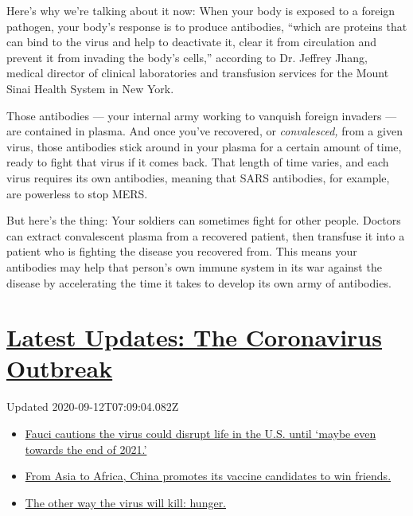 Here's why we're talking about it now: When your body is exposed to a
foreign pathogen, your body's response is to produce antibodies, ``which
are proteins that can bind to the virus and help to deactivate it, clear
it from circulation and prevent it from invading the body's cells,''
according to Dr. Jeffrey Jhang, medical director of clinical
laboratories and transfusion services for the Mount Sinai Health System
in New York.

Those antibodies --- your internal army working to vanquish foreign
invaders --- are contained in plasma. And once you've recovered, or
\emph{convalesced,} from a given virus, those antibodies stick around in
your plasma for a certain amount of time, ready to fight that virus if
it comes back. That length of time varies, and each virus requires its
own antibodies, meaning that SARS antibodies, for example, are powerless
to stop MERS.

But here's the thing: Your soldiers can sometimes fight for other
people. Doctors can extract convalescent plasma from a recovered
patient, then transfuse it into a patient who is fighting the disease
you recovered from. This means your antibodies may help that person's
own immune system in its war against the disease by accelerating the
time it takes to develop its own army of antibodies.

\hypertarget{latest-updates-the-coronavirus-outbreak}{%
\section{\texorpdfstring{\href{https://www.nytimes3xbfgragh.onion/2020/09/11/world/covid-19-coronavirus.html?action=click\&pgtype=Article\&state=default\&region=MAIN_CONTENT_1\&context=storylines_live_updates}{Latest
Updates: The Coronavirus
Outbreak}}{Latest Updates: The Coronavirus Outbreak}}\label{latest-updates-the-coronavirus-outbreak}}

Updated 2020-09-12T07:09:04.082Z

\begin{itemize}
\tightlist
\item
  \href{https://www.nytimes3xbfgragh.onion/2020/09/11/world/covid-19-coronavirus.html?action=click\&pgtype=Article\&state=default\&region=MAIN_CONTENT_1\&context=storylines_live_updates\#link-dfb8a16}{Fauci
  cautions the virus could disrupt life in the U.S. until `maybe even
  towards the end of 2021.'}
\item
  \href{https://www.nytimes3xbfgragh.onion/2020/09/11/world/covid-19-coronavirus.html?action=click\&pgtype=Article\&state=default\&region=MAIN_CONTENT_1\&context=storylines_live_updates\#link-7104d154}{From
  Asia to Africa, China promotes its vaccine candidates to win friends.}
\item
  \href{https://www.nytimes3xbfgragh.onion/2020/09/11/world/covid-19-coronavirus.html?action=click\&pgtype=Article\&state=default\&region=MAIN_CONTENT_1\&context=storylines_live_updates\#link-393ad215}{The
  other way the virus will kill: hunger.}
\end{itemize}

